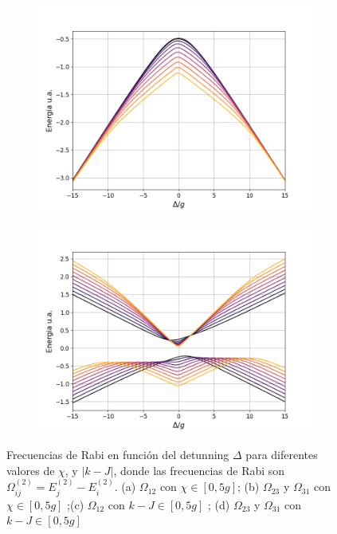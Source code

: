 \begin{figure}
    \vfill
    \begin{subfigure}{0.49\textwidth}
        \includegraphics[width=\textwidth]{figuras/ch4/omega12 2d k.png}
        \caption{}
        \label{fig4:rabi 1 k}
    \end{subfigure}
    \hfill
    \begin{subfigure}{0.49\textwidth}
        \includegraphics[width=\textwidth]{figuras/ch4/omega23 2d k.png}
        \caption{}
        \label{fig4:rabi 2 k}
    \end{subfigure}
    \caption{Frecuencias de Rabi en función del detunning $\Delta$ para diferentes valores de $\chi$, y $|k-J|$, donde las frecuencias de Rabi son $\Omega^{(2)}_{ij}=E^{(2)}_{j}-E^{(2)}_{i}$. (a) $\Omega_{12}$ con $\chi\in [0,5g]$; (b) $\Omega_{23}$ y $\Omega_{31}$ con $\chi\in [0,5g]$ ;(c) $\Omega_{12}$ con $k-J\in [0,5g]$ ; (d) $\Omega_{23}$ y $\Omega_{31}$ con $k-J\in [0,5g]$}
    \label{fig4:frecuencias de rabi}
\end{figure}


